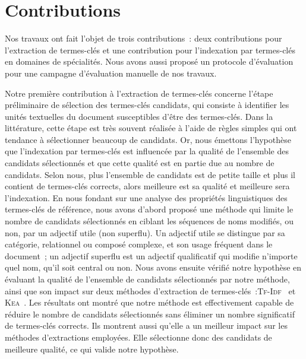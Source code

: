   \section{Contributions}
  \label{sec:main-conclusion-contributions}
    Nos travaux ont fait l'objet de trois contributions~: deux contributions
    pour l'extraction de termes-clés et une contribution pour l'indexation par
    termes-clés en domaines de spécialités. Nous avons aussi proposé un
    protocole d'évaluation pour une campagne d'évaluation manuelle de nos
    travaux.

    Notre première contribution à l'extraction de termes-clés concerne l'étape
    préliminaire de sélection des termes-clés candidats, qui consiste à
    identifier les unités textuelles du document susceptibles d'être des
    termes-clés. Dans la littérature, cette étape est très souvent réalisée à
    l'aide de règles simples qui ont tendance à sélectionner beaucoup de
    candidats. Or, nous émettons l'hypothèse que l'indexation par termes-clés
    est influencée par la qualité de l'ensemble des candidats sélectionnés et
    que cette qualité est en partie due au nombre de candidats. Selon nous, plus
    l'ensemble de candidats est de petite taille et plus il contient de
    termes-clés corrects, alors meilleure est sa qualité et meilleure sera
    l'indexation.
    En nous fondant sur une analyse des propriétés linguistiques des termes-clés
    de référence, nous avons d'abord proposé une méthode qui limite le nombre de
    candidats sélectionnés en ciblant les séquences de noms modifiés, ou non,
    par un adjectif utile (non superflu). Un adjectif utile se distingue par sa
    catégorie, relationnel ou composé complexe, et son usage fréquent dans le
    document~; un adjectif superflu est un adjectif qualificatif qui modifie
    n'importe quel nom, qu'il soit central ou non.
    Nous avons ensuite vérifié notre hypothèse en évaluant la qualité de
    l'ensemble de candidats sélectionnés par notre méthode, ainsi que son impact
    sur deux méthodes d'extraction de
    termes-clés~:\textsc{Tf-Idf}~\cite{jones1972tfidf} et
    \textsc{Kea}~\cite{witten1999kea}. Les résultats ont montré que notre
    méthode est effectivement capable de réduire le nombre de candidats
    sélectionnés sans éliminer un nombre significatif de termes-clés corrects.
    Ils montrent aussi qu'elle a un meilleur impact sur les méthodes
    d'extractions employées. Elle sélectionne donc des candidats de meilleure
    qualité, ce qui valide notre hypothèse.

